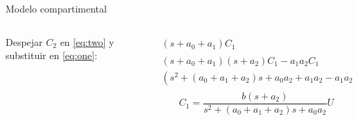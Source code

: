 \documentclass[dvisvgm,hypertex,aspectratio=169]{beamer}
\begin{document}
\begin{frame}[label=MC2]{Modelo compartimental}
\begin{columns}
\begin{column}{0.5\linewidth}
      
      Despejar $C_2$ en \eqref{eq:two} y substituir en \eqref{eq:one}:
    \end{column}
    \begin{column}{0.5\linewidth}
      \begin{align*}
        (s + a_0 + a_1)C_1 &= a_1\frac{a_2C_1}{s+a_2} + bU\\
        (s + a_0 + a_1)(s+a_2)C_1 - a_1a_2C_1 &= b(s+a_2)U\\
        (s^2 + (a_0 + a_1 +a_2)s + a_0a_2 + a_1a_2 - a_1a_2)C_1  &= b(s+a_2)U\\
      \end{align*}
      \[   C_1  = \frac{b(s+a_2)}{s^2 + (a_0 + a_1 +a_2)s  + a_0a_2}U \]

    \end{column}
  \end{columns}
\end{frame}


\note{%
}
\end{document}
